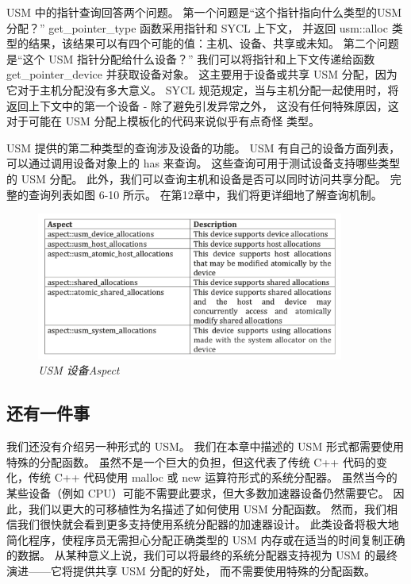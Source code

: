 USM 中的指针查询回答两个问题。 
第一个问题是“这个指针指向什么类型的USM分配？” get\_pointer\_type 函数采用指针和 SYCL 上下文，
并返回 usm::alloc 类型的结果，该结果可以有四个可能的值：主机、设备、共享或未知。 
第二个问题是“这个 USM 指针分配给什么设备？” 我们可以将指针和上下文传递给函数 get\_pointer\_device 并获取设备对象。 
这主要用于设备或共享 USM 分配，因为它对于主机分配没有多大意义。 
SYCL 规范规定，当与主机分配一起使用时，将返回上下文中的第一个设备 - 除了避免引发异常之外，
这没有任何特殊原因，这对于可能在 USM 分配上模板化的代码来说似乎有点奇怪 类型。

USM 提供的第二种类型的查询涉及设备的功能。 USM 有自己的设备方面列表，可以通过调用设备对象上的 has 来查询。 
这些查询可用于测试设备支持哪些类型的 USM 分配。 此外，我们可以查询主机和设备是否可以同时访问共享分配。 
完整的查询列表如图 6-10 所示。 在第12章中，我们将更详细地了解查询机制。

\begin{figure}[H]
	\centering
	\includegraphics[width=0.9\textwidth]{figs/F6.10.png}
	\caption{\textit{USM 设备Aspect }}
\end{figure}

\subsection{还有一件事}
我们还没有介绍另一种形式的 USM。 我们在本章中描述的 USM 形式都需要使用特殊的分配函数。 
虽然不是一个巨大的负担，但这代表了传统 C++ 代码的变化，传统 C++ 代码使用 malloc 或 new 运算符形式的系统分配器。 
虽然当今的某些设备（例如 CPU）可能不需要此要求，但大多数加速器设备仍然需要它。 
因此，我们以更大的可移植性为名描述了如何使用 USM 分配函数。 
然而，我们相信我们很快就会看到更多支持使用系统分配器的加速器设计。 
此类设备将极大地简化程序，使程序员无需担心分配正确类型的 USM 内存或在适当的时间复制正确的数据。 
从某种意义上说，我们可以将最终的系统分配器支持视为 USM 的最终演进——它将提供共享 USM 分配的好处，
而不需要使用特殊的分配函数。

